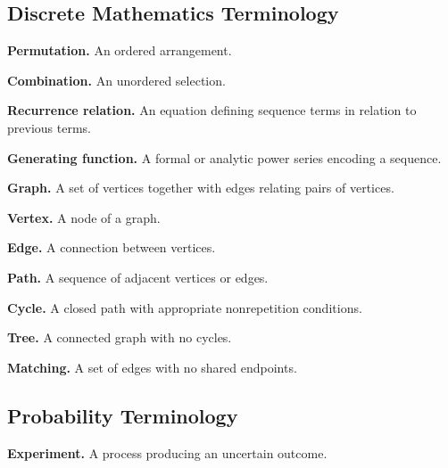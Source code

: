 \subsection{Discrete Mathematics Terminology}
\label{subsec:discrete-mathematics-terminology}

\textbf{Permutation.}
An ordered arrangement.

\medskip

\textbf{Combination.}
An unordered selection.

\medskip

\textbf{Recurrence relation.}
An equation defining sequence terms in relation to previous terms.

\medskip

\textbf{Generating function.}
A formal or analytic power series encoding a sequence.

\medskip

\textbf{Graph.}
A set of vertices together with edges relating pairs of vertices.

\medskip

\textbf{Vertex.}
A node of a graph.

\medskip

\textbf{Edge.}
A connection between vertices.

\medskip

\textbf{Path.}
A sequence of adjacent vertices or edges.

\medskip

\textbf{Cycle.}
A closed path with appropriate nonrepetition conditions.

\medskip

\textbf{Tree.}
A connected graph with no cycles.

\medskip

\textbf{Matching.}
A set of edges with no shared endpoints.

\subsection{Probability Terminology}
\label{subsec:probability-terminology-reference}

\textbf{Experiment.}
A process producing an uncertain outcome.

\medskip

